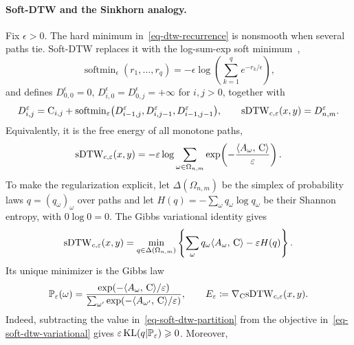 \paragraph{Soft-DTW and the Sinkhorn analogy.}
Fix $\epsilon>0$. The hard minimum in~\eqref{eq-dtw-recurrence} is nonsmooth when several paths tie. Soft-DTW replaces it with the log-sum-exp soft minimum~\cite{CuturiBlondel2017SoftDTW},
\begin{equation}\label{eq-dtw-softmin}
	\operatorname{softmin}_\epsilon(r_1,\ldots,r_q)
	=
	-\epsilon\log\!\left(\sum_{k=1}^q e^{-r_k/\epsilon}\right),
\end{equation}
and defines $D_{0,0}^\epsilon=0$, $D_{i,0}^\epsilon=D_{0,j}^\epsilon=+\infty$ for $i,j>0$, together with
\begin{equation}\label{eq-soft-dtw-recurrence}
	D_{i,j}^\varepsilon
	=
	\mathrm{C}_{i,j}
	+
	\operatorname{softmin}_\varepsilon
	\bigl(D_{i-1,j}^\varepsilon,D_{i,j-1}^\varepsilon,D_{i-1,j-1}^\varepsilon\bigr),
	\qquad
	\mathrm{sDTW}_{c,\varepsilon}(x,y)=D_{n,m}^\varepsilon.
\end{equation}
Equivalently, it is the free energy of all monotone paths,
\begin{equation}\label{eq-soft-dtw-partition}
	\mathrm{sDTW}_{c,\varepsilon}(x,y)
	=
	-\varepsilon\log
	\sum_{\omega\in\Omega_{n,m}}
	\exp\!\left(-\frac{\langle A_\omega,\,\mathrm{C}\rangle}{\varepsilon}\right).
\end{equation}
To make the regularization explicit, let $\Delta(\Omega_{n,m})$ be the simplex of probability laws $q=(q_\omega)_\omega$ over paths and let $H(q)=-\sum_\omega q_\omega\log q_\omega$ be their Shannon entropy, with $0\log0=0$. The Gibbs variational identity gives
\begin{equation}\label{eq-soft-dtw-variational}
	\mathrm{sDTW}_{c,\varepsilon}(x,y)
	=
	\min_{q\in\Delta(\Omega_{n,m})}
	\left\{
	\sum_{\omega}q_\omega\langle A_\omega,\,\mathrm{C}\rangle
	-\varepsilon H(q)
	\right\}.
\end{equation}
Its unique minimizer is the Gibbs law
\begin{equation}\label{eq-soft-dtw-gibbs-law}
	\mathbb{P}_\varepsilon(\omega)
	=
	\frac{\exp(-\langle A_\omega,\,\mathrm{C}\rangle/\varepsilon)}
	{\sum_{\omega'}\exp(-\langle A_{\omega'},\,\mathrm{C}\rangle/\varepsilon)},
	\qquad
	E_\varepsilon
	\coloneqq
	\nabla_{\mathrm{C}}\mathrm{sDTW}_{c,\varepsilon}(x,y).
\end{equation}
Indeed, subtracting the value in~\eqref{eq-soft-dtw-partition} from the objective in~\eqref{eq-soft-dtw-variational} gives $\varepsilon\operatorname{KL}(q|\mathbb{P}_\varepsilon)\geqslant0$. Moreover,

